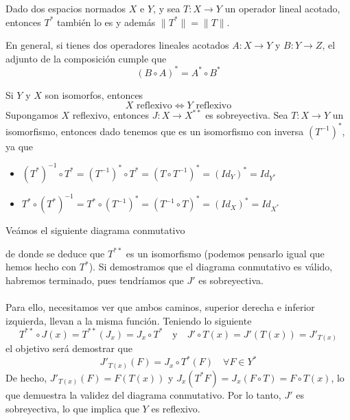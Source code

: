 \begin{prop}
    Dado dos espacios normados $X$ e $Y$, y sea $T: X \to Y$ un operador lineal acotado, entonces $T^*$ también lo es y además $\|T^*\|=\|T\|$.
\end{prop}

\begin{prop}
    En general, si tienes dos operadores lineales acotados $A: X \to Y$ y $B: Y \to Z$, el adjunto de la composición cumple que
    $$(B \circ A)^* = A^* \circ B^*$$
\end{prop}

\begin{ejercicio}
    Si $Y$ y $X$ son isomorfos, entonces 
    \begin{equation*}
        X \text{ reflexivo} \iff Y \text{ reflexivo}
    \end{equation*}
    Supongamos $X$ reflexivo, entonces $J: X \to X^{**}$ es sobreyectiva. Sea $T: X \to Y$ un isomorfismo, entonces dado 
    tenemos que es un isomorfismo con inversa $(T^{-1})^*$, ya que
    \begin{itemize}
        \item $(T^*)^{-1}\circ T^*=(T^{-1})^* \circ T^* = (T \circ T^{-1})^* = (Id_Y)^* = Id_{Y^*}$
        \item $T^*\circ (T^*)^{-1} = T^* \circ (T^{-1})^* = (T^{-1} \circ T)^* = (Id_X)^* = Id_{X^*}$
    \end{itemize}
    Veámos el siguiente diagrama conmutativo

    \begin{center}
    \end{center}
    
    de donde se deduce que $T^{**}$ es un isomorfismo (podemos pensarlo igual que hemos hecho con $T^*$). Si demostramos que el diagrama conmutativo es válido, habremos terminado, pues tendríamos que $J'$ es sobreyectiva. \\ \\
    \noindent
    Para ello, necesitamos ver que ambos caminos, superior derecha e inferior izquierda, llevan a la misma función. Teniendo lo siguiente
    \begin{equation*}
        T^{**} \circ J(x) = T^{**}(J_x) = J_x \circ T^* \quad \text{y} \quad J' \circ T(x) = J'(T(x)) = J'_{T(x)}
    \end{equation*}
    el objetivo será demostrar que 
    \begin{equation*}
        J'_{T(x)}(F) = J_x \circ T^*(F) \quad \forall F \in Y^*
    \end{equation*}
    De hecho, $J'_{T(x)}(F) = F(T(x))$ y $J_x(T^* F) = J_x(F \circ T) = F \circ T(x)$, lo que demuestra la validez del diagrama conmutativo. Por lo tanto, $J'$ es sobreyectiva, lo que implica que $Y$ es reflexivo. \\
\end{ejercicio}


